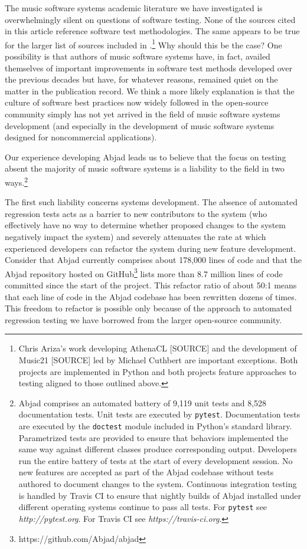 \documentclass{article}
\begin{document}
The music software systems academic literature we have investigated is
overwhelmingly silent on questions of software testing. None of the sources
cited in this article reference software test methodologies. The same appears
to be true for the larger list of sources included in
\cite{trevino2013compositional}.\footnote{Chris Ariza's work developing
AthenaCL [SOURCE] and the development of Music21 [SOURCE] led by Michael
Cuthbert are important exceptions. Both projects are implemented in Python and
both projects feature approaches to testing aligned to those outlined above.}
Why should this be the case? One possibility is that authors of music software
systems have, in fact, availed themselves of important improvements in software
test methods developed over the previous decades but have, for whatever
reasons, remained quiet on the matter in the publication record. We think a
more likely explanation is that the culture of software best practices now
widely followed in the open-source community simply has not yet arrived in the
field of music software systems development (and especially in the development
of music software systems designed for noncommercial applications).

Our experience developing Abjad leads us to believe that the focus on testing
absent the majority of music software systems is a liability to the field in
two ways.\footnote{Abjad comprises an automated battery of 9,119 unit tests and
8,528 documentation tests. Unit tests are executed by \texttt{pytest}.
Documentation tests are executed by the \texttt{doctest} module included in
Python's standard library. Parametrized tests are provided to ensure that
behaviors implemented the same way against different classes produce
corresponding output. Developers run the entire battery of tests at the start
of every development session. No new features are accepted as part of the Abjad
codebase without tests authored to document changes to the system. Continuous
integration testing is handled by Travis CI to ensure that nightly builds of
Abjad installed under different operating systems continue to pass all tests.
For \texttt{pytest} see \textit{http://pytest.org}. For Travis CI see
\textit{https://travis-ci.org}.}

The first such liability concerns systems development. The absence of automated
regression tests acts as a barrier to new contributors to the system (who
effectively have no way to determine whether proposed changes to the system
negatively impact the system) and severely attenuates the rate at which
experienced developers can refactor the system during new feature development.
Consider that Abjad currently comprises about 178,000 lines of code and that
the Abjad repository hosted on GitHub\footnote{https://github.com/Abjad/abjad}
lists more than 8.7 million lines of code committed since the start of the
project. This refactor ratio of about 50:1 means that each line of code in the
Abjad codebase has been rewritten dozens of times. This freedom to refactor is
possible only because of the approach to automated regression testing we have
borrowed from the larger open-source community.
\end{document}
